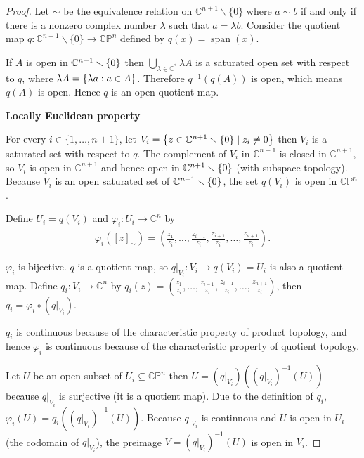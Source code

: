 \begin{proof}
	Let $\sim$ be the equivalence relation on $\mathbb{C}^{n+1}\smallsetminus\{0\}$ where $a\sim b$ if and only if there is a nonzero complex number $\lambda$ such that $a = \lambda b$. Consider the quotient map $q: \mathbb{C}^{n+1}\smallsetminus\{0\} \to \mathbb{CP}^{n}$ defined by $q(x) = \operatorname{span}(x)$.

	If $A$ is open in $\mathbb{C}^{n+1}\smallsetminus\left\{{0}\right\}$ then $\bigcup_{\lambda\in\mathbb{C}^{*}}\lambda A$ is a saturated open set with respect to $q$, where $\lambda A = \left\{{ \lambda a : a\in A }\right\}$. Therefore $q^{-1}(q(A))$ is open, which means $q(A)$ is open. Hence $q$ is an open quotient map.

	\textbf{Locally Euclidean property}

	For every $i\in \{ 1, \ldots, n+1 \}$, let $V_{i} = \left\{{ z \in \mathbb{C}^{n+1}\smallsetminus\left\{{0}\right\} \mid z_{i} \ne 0 }\right\}$ then $V_{i}$ is a saturated set with respect to $q$. The complement of $V_{i}$ in $\mathbb{C}^{n+1}$ is closed in $\mathbb{C}^{n+1}$, so $V_{i}$ is open in $\mathbb{C}^{n+1}$ and hence open in $\mathbb{C}^{n+1}\smallsetminus\left\{{0}\right\}$ (with subspace topology). Because $V_{i}$ is an open saturated set of $\mathbb{C}^{n+1}\smallsetminus\left\{{0}\right\}$, the set $q(V_{i})$ is open in $\mathbb{CP}^{n}$.

	Define $U_{i} = q(V_{i})$ and $\varphi_{i}: U_{i} \to \mathbb{C}^{n}$ by
	\begin{align*}
		\varphi_{i}({[z]}_{\sim}) = \left(\frac{z_{1}}{z_{i}}, \ldots, \frac{z_{i-1}}{z_{i}}, \frac{z_{i+1}}{z_{i}}, \ldots, \frac{z_{n+1}}{z_{i}}\right).
	\end{align*}

	$\varphi_{i}$ is bijective. $q$ is a quotient map, so $q\vert_{V_{i}}: V_{i} \to q(V_{i}) = U_{i}$ is also a quotient map. Define $q_{i}: V_{i}\to \mathbb{C}^{n}$ by $q_{i}(z) = \left( \frac{z_{1}}{z_{i}}, \ldots, \frac{z_{i-1}}{z_{i}}, \frac{z_{i+1}}{z_{i}}, \ldots, \frac{z_{n+1}}{z_{i}} \right)$, then $q_{i} = \varphi_{i} \circ (q\vert_{V_{i}})$.

	$q_{i}$ is continuous because of the characteristic property of product topology, and hence $\varphi_{i}$ is continuous because of the characteristic property of quotient topology.

	Let $U$ be an open subset of $U_{i} \subseteq \mathbb{CP}^{n}$ then $U = (q\vert_{V_{i}})({(q\vert_{V_{i}})}^{-1}(U))$ because $q\vert_{V_{i}}$ is surjective (it is a quotient map). Due to the definition of $q_{i}$, $\varphi_{i}(U) = q_{i}({(q\vert_{V_{i}})}^{-1}(U))$. Because $q\vert_{V_{i}}$ is continuous and $U$ is open in $U_{i}$ (the codomain of $q\vert_{V_{i}}$), the preimage $V = {(q\vert_{V_{i}})}^{-1}(U)$ is open in $V_{i}$.


\end{proof}
